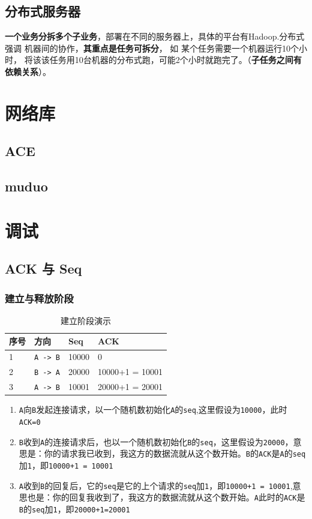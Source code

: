 \documentclass[UTF8,a4paper,8pt]{ctexbook}
\begin{document}
	\section{分布式服务器}
			\textbf{一个业务分拆多个子业务}，部署在不同的服务器上，具体的平台有Hadoop.分布式 强调 机器间的协作，\textbf{其重点是任务可拆分}， 如 某个任务需要一个机器运行10个小时， 将该该任务用10台机器的分布式跑，可能2个小时就跑完了。（\textbf{子任务之间有依赖关系}）。
\chapter{网络库}
	\section{ACE}
	\section{muduo}
		 
		
\chapter{调试}
	\section{ACK 与 Seq}
		\subsection{建立与释放阶段}
			\begin{table}[htbp]
				\centering
				\caption{建立阶段演示}
				\begin{tabular}{m{1cm}|m{3cm}|m{4cm}|m{4cm}}
					\toprule
						序号 & 方向 & Seq & ACK \\
					\midrule
						 1& \verb|A -> B|& 10000 & 0 \\
						 2& \verb|B -> A|& 20000 & 10000+1 = 10001 \\
					 	 3& \verb|A -> B|& 10001 & 20000+1 = 20001 \\
					\bottomrule
				\end{tabular}
			\end{table}
			\begin{enumerate}
				\item \verb|A|向\verb|B|发起连接请求，以一个随机数初始化\verb|A|的\verb|seq|,这里假设为\verb|10000|，此时\verb|ACK=0|
				\item \verb|B|收到\verb|A|的连接请求后，也以一个随机数初始化\verb|B|的\verb|seq|，这里假设为\verb|20000|，意思是：你的请求我已收到，我这方的数据流就从这个数开始。\verb|B|的\verb|ACK|是\verb|A|的\verb|seq|加\verb|1|，即\verb|10000+1 = 10001|
				\item \verb|A|收到\verb|B|的回复后，它的\verb|seq|是它的上个请求的\verb|seq|加\verb|1|，即\verb|10000+1 = 10001|,意思也是：你的回复我收到了，我这方的数据流就从这个数开始。\verb|A|此时的\verb|ACK|是\verb|B|的\verb|seq|加\verb|1|，即\verb|20000+1=20001|
			\end{enumerate}
		
\end{document}
